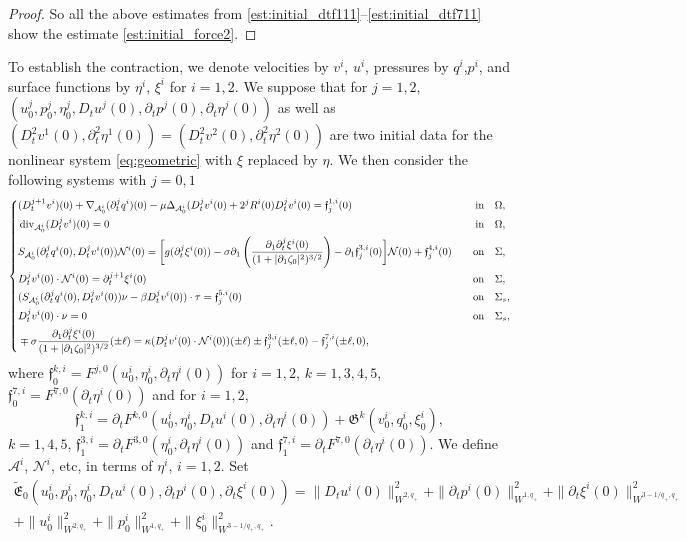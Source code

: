 \documentclass[letterpaper,reqno,10pt,twoside]{amsart}
\theoremstyle{definition}
\theoremstyle{remark}
\def\p{\partial}
\def\Om{\Omega}
\def\dive{\mathop{\rm div}\nolimits}
\begin{document}
\begin{appendix}
\begin{proof}
				So all the above estimates from \eqref{est:initial_dtf111}--\eqref{est:initial_dtf711} show the estimate \eqref{est:initial_force2}.
			\end{proof}
			
			To establish the contraction, we denote velocities by $v^i$, $u^i$, pressures by $q^i$,$ p^i$, and surface functions by $\eta^i$, $\xi^i$ for $i=1, 2$. We suppose that for $j=1, 2$, $(u_0^j, p_0^j, \eta_0^j, D_tu^j(0), \p_tp^j(0), \p_t\eta^j(0))$
			as well as $(D_t^2v^1(0), \p_t^2\eta^1(0))=(D_t^2v^2(0), \p_t^2\eta^2(0))$ are two initial data for the nonlinear system \eqref{eq:geometric} with $\xi$ replaced by $\eta$. We then consider the following systems with $j=0, 1$
			\begin{equation}\label{eq:pde_dt1}
				\left\{
				\begin{aligned}
					&(D_t^{j+1}v^i)(0)+\nabla_{\mathcal{A}^i_0}(\p_t^jq^i)(0)-\mu\Delta_{\mathcal{A}^i_0}(D_t^jv^i(0)+2^jR^i(0)D_t^jv^i(0)=\mathfrak{f}^{1,i}_{j}(0)\quad&\text{in}&\quad\Om,\\
					&\dive_{\mathcal{A}^i_0}(D_t^jv^i)(0)=0\quad&\text{in}&\quad\Om,\\
					&S_{\mathcal{A}^i_0}(\p_t^jq^i(0),D_t^jv^i(0))\mathcal{N}^i(0)=\bigg[g(\p_t^j\xi^i(0))-\sigma\p_1\left(\frac{\p_1\p_t^j\xi^i(0)}{(1+|\p_1\zeta_0|^2)^{3/2}}\right)-\p_1 \mathfrak{f}^{3,i}_j(0)\bigg]\mathcal{N}(0)+\mathfrak{f}^{4,i}_j(0)\quad&\text{on}&\quad\Sigma,\\
					&D_t^jv^i(0)\cdot\mathcal{N}^i(0)=\p_t^{j+1}\xi^i(0)\quad&\text{on}&\quad \Sigma,\\
					&(S_{\mathcal{A}^i_0}(\p_t^jq^i(0),D_t^jv^i(0))\nu-\beta D_t^jv^i(0))\cdot\tau=\mathfrak{f}^{5,i}_j(0)\quad&\text{on}&\quad\Sigma_s,\\
					&D_t^jv^i(0)\cdot\nu=0\quad&\text{on}&\quad\Sigma_s,\\
					&\mp\sigma\frac{\p_1\p_t^j\xi^i(0)}{(1+|\p_1\zeta_0|^2)^{3/2}}(\pm\ell)=\kappa(D_t^jv^i(0)\cdot\mathcal{N}^i(0))(\pm\ell)\pm \mathfrak{f}^{3,i}_j(\pm\ell,0)-\mathfrak{f}^{7,i}_j(\pm\ell,0),
				\end{aligned}
				\right.
			\end{equation}
			where $\mathfrak{f}^{k,i}_0=F^{j,0}(u_0^i,\eta_0^i,\p_t\eta^i(0))$ for $i=1, 2$, $k=1, 3, 4, 5$, $\mathfrak{f}^{7,i}_0=F^{7,0}(\p_t\eta^i(0))$ and for $i=1, 2$,
			\[
			\mathfrak{f}^{k,i}_1=\p_tF^{k,0}(u_0^i,\eta_0^i,D_tu^i(0),\p_t\eta^i(0))+\mathfrak{G}^{k}(v^i_0, q^i_0, \xi^i_0),
			\]
			$k=1, 4, 5$, $\mathfrak{f}^{3,i}_1=\p_tF^{3,0}(\eta_0^i,\p_t\eta^i(0))$ and $\mathfrak{f}^{7,i}_1=\p_tF^{7,0}(\p_t\eta^i(0))$.  We define $\mathcal{A}^i$, $\mathcal{N}^i$, etc, in terms of $\eta^i$, $i=1, 2$.
			Set
			\[
			\begin{aligned}
				\widetilde{\mathfrak{E}}_0(u_0^i,p_0^i,\eta_0^i, D_tu^i(0),\p_tp^i(0),\p_t\xi^i(0))=\|D_tu^i(0)\|_{W^{2, q_+}}^2+\|\p_tp^i(0)\|_{W^{1, q_+}}^2+\|\p_t\xi^i(0)\|_{W^{3-1/q_+, q_+}}^2\\
				+\|u_0^i\|_{W^{2, q_+}}^2+\|p_0^i\|_{W^{1, q_+}}^2+\|\xi_0^i\|_{W^{3-1/q_+, q_+}}^2.
			\end{aligned}
			\]
			

\end{appendix}
\end{document}

